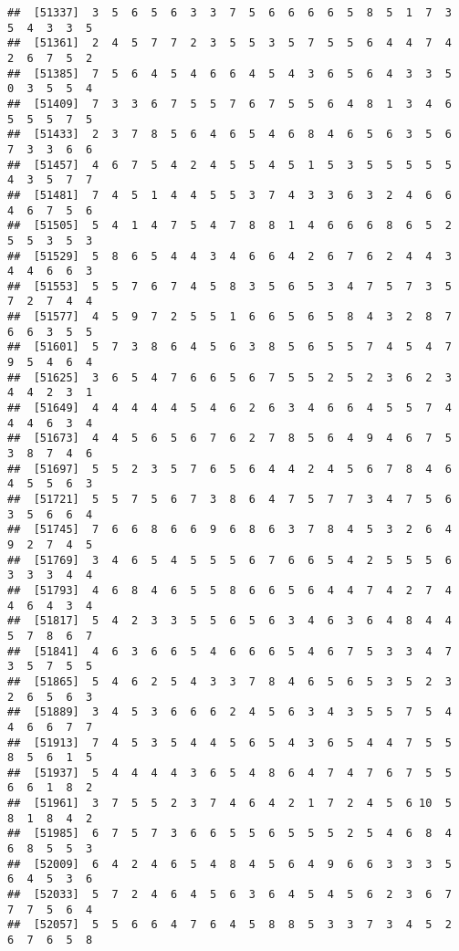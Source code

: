 \documentclass[
]{book}
\begin{document}
\begin{verbatim}
##  [51337]  3  5  6  5  6  3  3  7  5  6  6  6  6  5  8  5  1  7  3  5  4  3  3  5
##  [51361]  2  4  5  7  7  2  3  5  5  3  5  7  5  5  6  4  4  7  4  2  6  7  5  2
##  [51385]  7  5  6  4  5  4  6  6  4  5  4  3  6  5  6  4  3  3  5  0  3  5  5  4
##  [51409]  7  3  3  6  7  5  5  7  6  7  5  5  6  4  8  1  3  4  6  5  5  5  7  5
##  [51433]  2  3  7  8  5  6  4  6  5  4  6  8  4  6  5  6  3  5  6  7  3  3  6  6
##  [51457]  4  6  7  5  4  2  4  5  5  4  5  1  5  3  5  5  5  5  5  4  3  5  7  7
##  [51481]  7  4  5  1  4  4  5  5  3  7  4  3  3  6  3  2  4  6  6  4  6  7  5  6
##  [51505]  5  4  1  4  7  5  4  7  8  8  1  4  6  6  6  8  6  5  2  5  5  3  5  3
##  [51529]  5  8  6  5  4  4  3  4  6  6  4  2  6  7  6  2  4  4  3  4  4  6  6  3
##  [51553]  5  5  7  6  7  4  5  8  3  5  6  5  3  4  7  5  7  3  5  7  2  7  4  4
##  [51577]  4  5  9  7  2  5  5  1  6  6  5  6  5  8  4  3  2  8  7  6  6  3  5  5
##  [51601]  5  7  3  8  6  4  5  6  3  8  5  6  5  5  7  4  5  4  7  9  5  4  6  4
##  [51625]  3  6  5  4  7  6  6  5  6  7  5  5  2  5  2  3  6  2  3  4  4  2  3  1
##  [51649]  4  4  4  4  4  5  4  6  2  6  3  4  6  6  4  5  5  7  4  4  4  6  3  4
##  [51673]  4  4  5  6  5  6  7  6  2  7  8  5  6  4  9  4  6  7  5  3  8  7  4  6
##  [51697]  5  5  2  3  5  7  6  5  6  4  4  2  4  5  6  7  8  4  6  4  5  5  6  3
##  [51721]  5  5  7  5  6  7  3  8  6  4  7  5  7  7  3  4  7  5  6  3  5  6  6  4
##  [51745]  7  6  6  8  6  6  9  6  8  6  3  7  8  4  5  3  2  6  4  9  2  7  4  5
##  [51769]  3  4  6  5  4  5  5  5  6  7  6  6  5  4  2  5  5  5  6  3  3  3  4  4
##  [51793]  4  6  8  4  6  5  5  8  6  6  5  6  4  4  7  4  2  7  4  4  6  4  3  4
##  [51817]  5  4  2  3  3  5  5  6  5  6  3  4  6  3  6  4  8  4  4  5  7  8  6  7
##  [51841]  4  6  3  6  6  5  4  6  6  6  5  4  6  7  5  3  3  4  7  3  5  7  5  5
##  [51865]  5  4  6  2  5  4  3  3  7  8  4  6  5  6  5  3  5  2  3  2  6  5  6  3
##  [51889]  3  4  5  3  6  6  6  2  4  5  6  3  4  3  5  5  7  5  4  4  6  6  7  7
##  [51913]  7  4  5  3  5  4  4  5  6  5  4  3  6  5  4  4  7  5  5  8  5  6  1  5
##  [51937]  5  4  4  4  4  3  6  5  4  8  6  4  7  4  7  6  7  5  5  6  6  1  8  2
##  [51961]  3  7  5  5  2  3  7  4  6  4  2  1  7  2  4  5  6 10  5  8  1  8  4  2
##  [51985]  6  7  5  7  3  6  6  5  5  6  5  5  5  2  5  4  6  8  4  6  8  5  5  3
##  [52009]  6  4  2  4  6  5  4  8  4  5  6  4  9  6  6  3  3  3  5  6  4  5  3  6
##  [52033]  5  7  2  4  6  4  5  6  3  6  4  5  4  5  6  2  3  6  7  7  7  5  6  4
##  [52057]  5  5  6  6  4  7  6  4  5  8  8  5  3  3  7  3  4  5  2  6  7  6  5  8

\end{verbatim}
\end{document}
